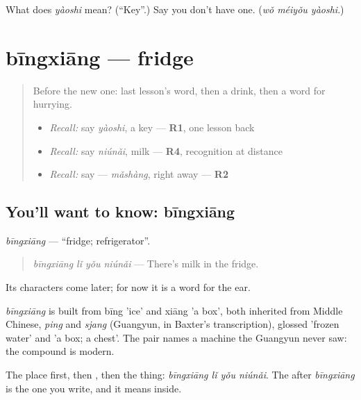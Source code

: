 \begin{tcolorbox}[breakable,colback=teal!4,colframe=teal!35!black,title={Before you move on}]
What does \emph{yàoshi} mean? (\textquotedblleft{}Key\textquotedblright{}.) Say you don't have one. (\emph{wǒ méiyǒu yàoshi}.)
\end{tcolorbox}
\section[bīngxiāng]{bīngxiāng — fridge}

\label{lesson:ZH-C87-bingxiang}



\begin{quote}
Before the new one: last lesson's word, then a drink, then a word for hurrying.

\begin{itemize}
\raggedright
  \item \emph{Recall:} say \emph{yàoshi}, a key — \textbf{R1}, one lesson back
  \item \emph{Recall:} say \emph{niúnǎi}, milk — \textbf{R4}, recognition at distance
  \item \emph{Recall:} say  — \emph{mǎshàng}, right away — \textbf{R2}
\end{itemize}
\end{quote}

\subsection*{You'll want to know: bīngxiāng}
\emph{bīngxiāng} — \textquotedblleft{}fridge; refrigerator\textquotedblright{}.

\begin{quote}
\emph{bīngxiāng lǐ yǒu niúnǎi} — There's milk in the fridge.
\end{quote}

Its characters come later; for now it is a word for the ear.

\begin{cousinweb}
\emph{bīngxiāng} is built from bīng 'ice' and xiāng 'a box', both inherited from Middle Chinese, \emph{ping} and \emph{sjang} (Guangyun, in Baxter's transcription), glossed 'frozen water' and 'a box; a chest'. The pair names a machine the Guangyun never saw: the compound is modern.
\end{cousinweb}

\begin{grammarlens}[title={What you've built}]
The place first, then , then the thing: \emph{bīngxiāng lǐ yǒu niúnǎi}. The  after \emph{bīngxiāng} is the one you write, and it means inside.
\end{grammarlens}


